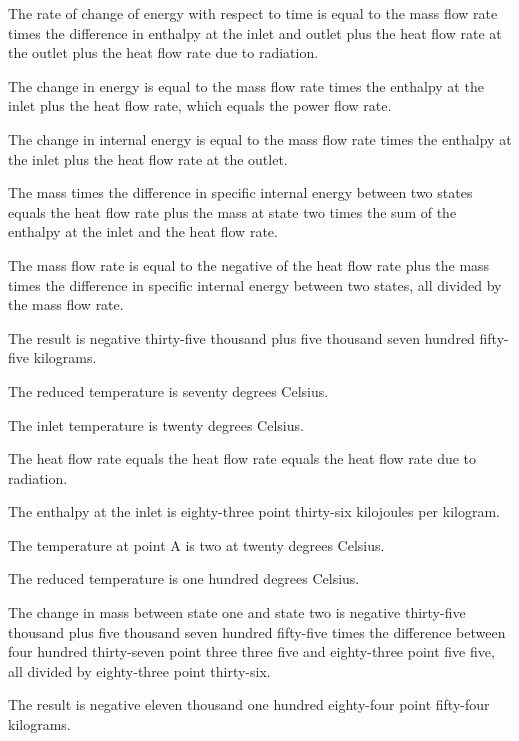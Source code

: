 The rate of change of energy with respect to time is equal to the mass flow rate times the difference in enthalpy at the inlet and outlet plus the heat flow rate at the outlet plus the heat flow rate due to radiation.

The change in energy is equal to the mass flow rate times the enthalpy at the inlet plus the heat flow rate, which equals the power flow rate.

The change in internal energy is equal to the mass flow rate times the enthalpy at the inlet plus the heat flow rate at the outlet.

The mass times the difference in specific internal energy between two states equals the heat flow rate plus the mass at state two times the sum of the enthalpy at the inlet and the heat flow rate.

The mass flow rate is equal to the negative of the heat flow rate plus the mass times the difference in specific internal energy between two states, all divided by the mass flow rate.

The result is negative thirty-five thousand plus five thousand seven hundred fifty-five kilograms.

The reduced temperature is seventy degrees Celsius.

The inlet temperature is twenty degrees Celsius.

The heat flow rate equals the heat flow rate equals the heat flow rate due to radiation.

The enthalpy at the inlet is eighty-three point thirty-six kilojoules per kilogram.

The temperature at point A is two at twenty degrees Celsius.

The reduced temperature is one hundred degrees Celsius.

The change in mass between state one and state two is negative thirty-five thousand plus five thousand seven hundred fifty-five times the difference between four hundred thirty-seven point three three five and eighty-three point five five, all divided by eighty-three point thirty-six.

The result is negative eleven thousand one hundred eighty-four point fifty-four kilograms.